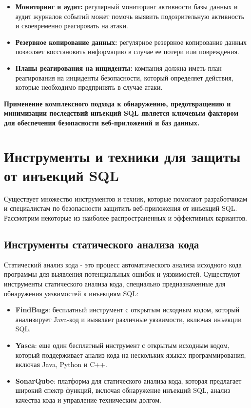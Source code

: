 \documentclass[a4paper,12pt]{diplom}
\begin{document}
	 \begin{itemize}
	 	\item \textbf{Мониторинг и аудит:} регулярный мониторинг активности базы данных и аудит журналов событий может помочь выявить подозрительную активность и своевременно реагировать на атаки. 
	 	\item \textbf{Резервное копирование данных:} регулярное резервное копирование данных позволяет восстановить информацию в случае ее потери или повреждения. 
	 	\item \textbf{Планы реагирования на инциденты:} компания должна иметь план реагирования на инциденты безопасности, который определяет действия, которые необходимо предпринять в случае атаки. 
	 \end{itemize}
	 
	 \textbf{Применение комплексного подхода к обнаружению, предотвращению и минимизации последствий инъекций SQL является ключевым фактором для обеспечения безопасности веб-приложений и баз данных.} 
	 
	 
	 
	 
	 
	 
	 
	 
	 \section{Инструменты и техники для защиты от инъекций SQL}
	 
	 Существует множество инструментов и техник, которые помогают разработчикам и специалистам по безопасности защитить веб-приложения от инъекций SQL.  Рассмотрим некоторые из наиболее распространенных и эффективных вариантов.
	 
	 \subsection{Инструменты статического анализа кода}
	 
	 Статический анализ кода - это процесс автоматического анализа исходного кода программы для выявления потенциальных ошибок и уязвимостей.  Существуют инструменты статического анализа кода,  специально предназначенные для обнаружения уязвимостей к инъекциям SQL:
	 
	 \begin{itemize}
	 	\item \textbf{FindBugs}:  бесплатный инструмент с открытым исходным кодом, который анализирует Java-код и выявляет различные уязвимости,  включая инъекции SQL.
	 	\item \textbf{Yasca}:  еще один бесплатный инструмент с открытым исходным кодом, который поддерживает анализ кода на нескольких языках программирования,  включая Java,  Python и C++.
	 	\item \textbf{SonarQube}:  платформа для статического анализа кода,  которая предлагает широкий спектр функций,  включая обнаружение инъекций SQL,  анализ качества кода и управление техническим долгом. 
	 \end{itemize}
	 
\end{document}
